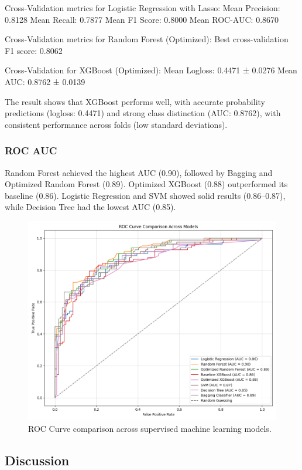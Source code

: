 \documentclass{article}
\begin{document}
Cross-Validation metrics for Logistic Regression with Lasso:
Mean Precision: 0.8128
Mean Recall: 0.7877
Mean F1 Score: 0.8000
Mean ROC-AUC: 0.8670

Cross-Validation metrics for Random Forest (Optimized):
Best cross-validation F1 score: 0.8062

Cross-Validation for XGBoost (Optimized):
Mean Logloss: 0.4471 ± 0.0276
Mean AUC: 0.8762 ± 0.0139

The result shows that XGBoost performs well, with accurate probability predictions (logloss: 0.4471) and strong class distinction (AUC: 0.8762), with consistent performance across folds (low standard deviations).


\subsubsection*{ROC AUC}

Random Forest achieved the highest AUC (0.90), followed by Bagging and Optimized Random Forest (0.89). Optimized XGBoost (0.88) outperformed its baseline (0.86). Logistic Regression and SVM showed solid results (0.86–0.87), while Decision Tree had the lowest AUC (0.85).

\begin{figure}[h!]
    \centering
    \includegraphics[width=\textwidth]{Figure_1.png}
    \caption{ROC Curve comparison across supervised machine learning models.}
    \label{fig:ROC}
\end{figure}

\subsection*{Discussion}
\end{document}
